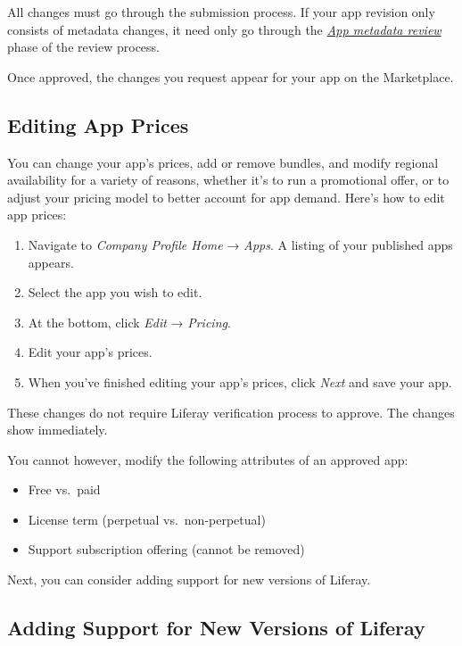 All changes must go through the submission process. If your app revision
only consists of metadata changes, it need only go through the
\href{/how-to-publish/-/knowledge_base/publish/understanding-the-app-review-process}{\emph{App
metadata review}} phase of the review process.

Once approved, the changes you request appear for your app on the
Marketplace.

\subsection{Editing App Prices}\label{editing-app-prices}

You can change your app's prices, add or remove bundles, and modify
regional availability for a variety of reasons, whether it's to run a
promotional offer, or to adjust your pricing model to better account for
app demand. Here's how to edit app prices:

\begin{enumerate}
\def\labelenumi{\arabic{enumi}.}
\item
  Navigate to \emph{Company Profile Home} → \emph{Apps}. A listing of
  your published apps appears.
\item
  Select the app you wish to edit.
\item
  At the bottom, click \emph{Edit} → \emph{Pricing}.
\item
  Edit your app's prices.
\item
  When you've finished editing your app's prices, click \emph{Next} and
  save your app.
\end{enumerate}

These changes do not require Liferay verification process to approve.
The changes show immediately.

You cannot however, modify the following attributes of an approved app:

\begin{itemize}
\tightlist
\item
  Free vs.~paid
\item
  License term (perpetual vs.~non-perpetual)
\item
  Support subscription offering (cannot be removed)
\end{itemize}

Next, you can consider adding support for new versions of Liferay.

\subsection{Adding Support for New Versions of
Liferay}\label{adding-support-for-new-versions-of-liferay}

